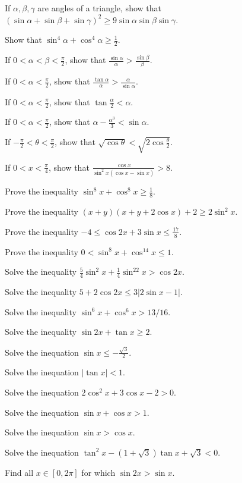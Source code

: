 \item If $\alpha, \beta, \gamma$ are angles of a triangle, show that $(\sin\alpha + \sin\beta
  + \sin\gamma)^2\geq 9\sin\alpha\sin\beta\sin\gamma$.
\item Show that $\sin^4\alpha + \cos^4\alpha\geq \frac{1}{2}$.
\item If $0 < \alpha < \beta < \frac{\pi}{2}$, show that $\frac{\sin\alpha}{\alpha}
  > \frac{\sin\beta}{\beta}$.
\item If $0 < \alpha < \frac{\pi}{2}$, show that $\frac{\tan\alpha}{\alpha} > \frac{\alpha}{\sin\alpha}$.
\item If $0 < \alpha < \frac{\pi}{2}$, show that $\tan\frac{\alpha}{2} < \alpha$.
\item If $0 < \alpha < \frac{\pi}{2}$, show that $\alpha - \frac{\alpha^3}{3} < \sin\alpha$.
\item If $-\frac{\pi}{2} < \theta < \frac{\pi}{2}$, show that $\sqrt{\cos\theta} <
  \sqrt{2\cos\frac{\theta}{2}}$.
\item If $0 < x < \frac{\pi}{4}$, show that $\frac{\cos x}{\sin^2x(\cos x - \sin x)} > 8$.
\item Prove the inequality $\sin^8x + \cos^8x \geq \frac{1}{8}$.
\item Prove the inequality $(x + y)(x + y + 2\cos x) + 2\geq 2\sin^2x$.
\item Prove the inequality $-4\leq \cos2x + 3\sin x\leq \frac{17}{8}$.
\item Prove the inequality $0 < \sin^8x + \cos^{14}x \leq 1$.
\item Solve the inequality $\frac{5}{4}\sin^2x + \frac{1}{4}\sin^22x > \cos2x$.
\item Solve the inequality $5 + 2\cos2x\leq 3|2\sin x - 1|$.
\item Solve the inequality $\sin^6x + \cos^6x > 13/16$.
\item Solve the inequality $\sin2x + \tan x\geq 2$.
\item Solve the inequation $\sin x\leq -\frac{\sqrt{3}}{2}$.
\item Solve the inequation $|\tan x| < 1$.
\item Solve the inequation $2\cos^2x + 3\cos x - 2 > 0$.
\item Solve the inequation $\sin x + \cos x > 1$.
\item Solve the inequation $\sin x > \cos x$.
\item Solve the inequation $\tan^2x - (1 + \sqrt{3})\tan x + \sqrt{3} < 0$.
\item Find all $x\in[0, 2\pi]$ for which $\sin2x > \sin x$.
